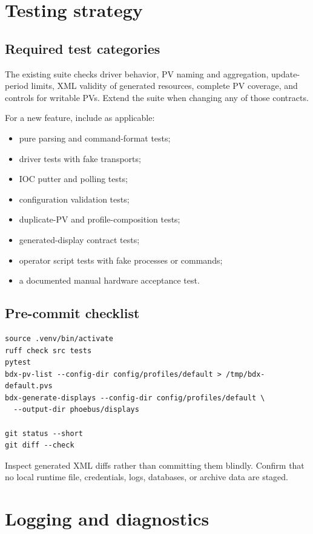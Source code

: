\section{Testing strategy}

\subsection{Required test categories}

The existing suite checks driver behavior, PV naming and aggregation, update-period limits, XML validity of generated  resources, complete PV coverage, and controls for writable PVs. Extend the suite when changing any of those contracts.

For a new feature, include as applicable:

\begin{itemize}
  \item pure parsing and command-format tests;
  \item driver tests with fake transports;
  \item IOC putter and polling tests;
  \item configuration validation tests;
  \item duplicate-PV and profile-composition tests;
  \item generated-display contract tests;
  \item operator script tests with fake processes or commands;
  \item a documented manual hardware acceptance test.
\end{itemize}

\subsection{Pre-commit checklist}

\begin{lstlisting}[style=shell]
source .venv/bin/activate
ruff check src tests
pytest
bdx-pv-list --config-dir config/profiles/default > /tmp/bdx-default.pvs
bdx-generate-displays --config-dir config/profiles/default \
  --output-dir phoebus/displays

git status --short
git diff --check
\end{lstlisting}

Inspect generated XML diffs rather than committing them blindly. Confirm that no local runtime file, credentials, logs, databases, or archive data are staged.

\section{Logging and diagnostics}

